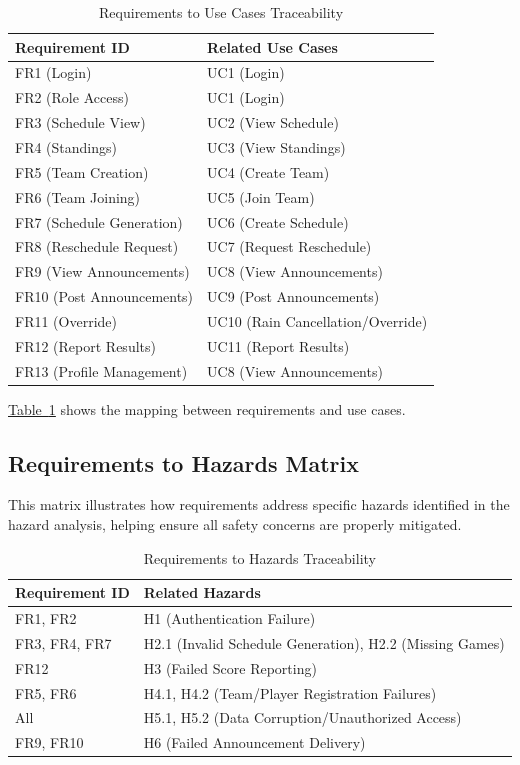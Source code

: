 \documentclass[12pt, titlepage]{article}
\begin{document}
\begin{table}[H]
\centering
\begin{tabular}{|p{}|p{}|}
\hline
\textbf{Requirement ID} & \textbf{Related Use Cases} \\
\hline
FR1 (Login) & UC1 (Login) \\
\hline
FR2 (Role Access) & UC1 (Login) \\
\hline
FR3 (Schedule View) & UC2 (View Schedule) \\
\hline
FR4 (Standings) & UC3 (View Standings) \\
\hline
FR5 (Team Creation) & UC4 (Create Team) \\
\hline
FR6 (Team Joining) & UC5 (Join Team) \\
\hline
FR7 (Schedule Generation) & UC6 (Create Schedule) \\
\hline
FR8 (Reschedule Request) & UC7 (Request Reschedule) \\
\hline
FR9 (View Announcements) & UC8 (View Announcements) \\
\hline
FR10 (Post Announcements) & UC9 (Post Announcements) \\
\hline
FR11 (Override) & UC10 (Rain Cancellation/Override) \\
\hline
FR12 (Report Results) & UC11 (Report Results) \\
\hline
FR13 (Profile Management) & UC8 (View Announcements) \\
\hline
\end{tabular}
\caption{Requirements to Use Cases Traceability}
\label{tab:req_usecase_matrix}
\end{table}

\hyperref[tab:req_usecase_matrix]{Table~\ref{tab:req_usecase_matrix}} shows the mapping between requirements and use cases.

\subsection{Requirements to Hazards Matrix}
This matrix illustrates how requirements address specific hazards identified in the hazard analysis, helping ensure all safety concerns are properly mitigated.

\begin{table}[H]
\centering
\begin{tabular}{|p{}|p{}|}
\hline
\textbf{Requirement ID} & \textbf{Related Hazards} \\
\hline
FR1, FR2 & H1 (Authentication Failure) \\
\hline
FR3, FR4, FR7 & H2.1 (Invalid Schedule Generation), H2.2 (Missing Games) \\
\hline
FR12 & H3 (Failed Score Reporting) \\
\hline
FR5, FR6 & H4.1, H4.2 (Team/Player Registration Failures) \\
\hline
All & H5.1, H5.2 (Data Corruption/Unauthorized Access) \\
\hline
FR9, FR10 & H6 (Failed Announcement Delivery) \\
\hline
\end{tabular}
\caption{Requirements to Hazards Traceability}
\label{tab:req_hazard_matrix}
\end{table}
\end{document}
